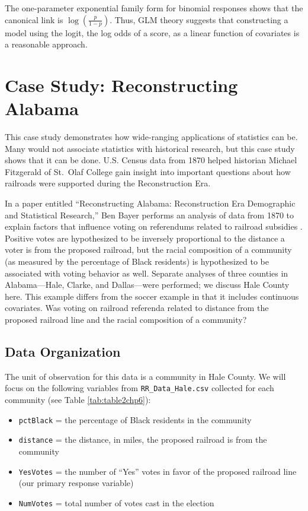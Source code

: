 \documentclass[
]{krantz}
\begin{document}
The one-parameter exponential family form for binomial responses shows that the canonical link is \(\log\left(\frac{p}{1-p}\right)\). Thus, GLM theory suggests that constructing a model using the logit, the log odds of a score, as a linear function of covariates is a reasonable approach.

\section{Case Study: Reconstructing Alabama}\label{case-study-reconstructing-alabama}

This case study demonstrates how wide-ranging applications of statistics can be. Many would not associate statistics with historical research, but this case study shows that it can be done. U.S. Census data from 1870 helped historian Michael Fitzgerald of St.~Olaf College gain insight into important questions about how railroads were supported during the Reconstruction Era.

In a paper entitled ``Reconstructing Alabama: Reconstruction Era Demographic and Statistical Research,'' Ben Bayer performs an analysis of data from 1870 to explain factors that influence voting on referendums related to railroad subsidies \citep{Bayer2011}. Positive votes are hypothesized to be inversely proportional to the distance a voter is from the proposed railroad, but the racial composition of a community (as measured by the percentage of Black residents) is hypothesized to be associated with voting behavior as well. Separate analyses of three counties in Alabama---Hale, Clarke, and Dallas---were performed; we discuss Hale County here. This example differs from the soccer example in that it includes continuous covariates. Was voting on railroad referenda related to distance from the proposed railroad line and the racial composition of a community?

\subsection{Data Organization}\label{data-organization-3}

The unit of observation for this data is a community in Hale County. We will focus on the following variables from \texttt{RR\_Data\_Hale.csv} collected for each community (see Table \ref{tab:table2chp6}):

\begin{itemize}
\item
  \texttt{pctBlack} = the percentage of Black residents in the community
\item
  \texttt{distance} = the distance, in miles, the proposed railroad is from the community
\item
  \texttt{YesVotes} = the number of ``Yes'' votes in favor of the proposed railroad line (our primary response variable)
\item
  \texttt{NumVotes} = total number of votes cast in the election
\end{itemize}
\end{document}
